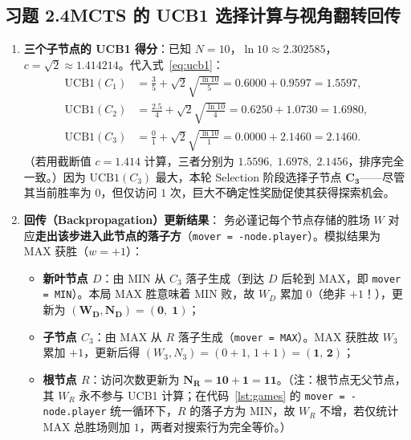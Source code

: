 \subsection*{习题 2.4\quad MCTS 的 UCB1 选择计算与视角翻转回传}
\begin{enumerate}[label=(\arabic*), leftmargin=1.8em]
  \item \textbf{三个子节点的 UCB1 得分}：已知 $N = 10$，$\ln 10 \approx 2.302585$，$c = \sqrt{2} \approx 1.414214$。代入式~\eqref{eq:ucb1}：
  \begin{align*}
    \mathrm{UCB1}(C_1) &= \frac{3}{5} + \sqrt{2}\sqrt{\frac{\ln 10}{5}} = 0.6000 + 0.9597 = \mathbf{1.5597}, \\
    \mathrm{UCB1}(C_2) &= \frac{2.5}{4} + \sqrt{2}\sqrt{\frac{\ln 10}{4}} = 0.6250 + 1.0730 = \mathbf{1.6980}, \\
    \mathrm{UCB1}(C_3) &= \frac{0}{1} + \sqrt{2}\sqrt{\frac{\ln 10}{1}} = 0.0000 + 2.1460 = \mathbf{2.1460}.
  \end{align*}
  （若用截断值 $c=1.414$ 计算，三者分别为 $1.5596,\; 1.6978,\; 2.1456$，排序完全一致。）因为 $\mathrm{UCB1}(C_3)$ 最大，本轮 Selection 阶段选择子节点 $\mathbf{C_3}$——尽管其当前胜率为 $0$，但仅访问 $1$ 次，巨大不确定性奖励促使其获得探索机会。
  \item \textbf{回传（Backpropagation）更新结果}：
  务必谨记每个节点存储的胜场 $W$ 对应\textbf{走出该步进入此节点的落子方}（\texttt{mover = -node.player}）。模拟结果为 \textsf{MAX} 获胜（$w = +1$）：
  \begin{itemize}
    \item \textbf{新叶节点 $D$}：由 \textsf{MIN} 从 $C_3$ 落子生成（到达 $D$ 后轮到 \textsf{MAX}，即 \texttt{mover = MIN}）。本局 \textsf{MAX} 胜意味着 \textsf{MIN} 败，故 $W_D$ 累加 $0$（绝非 $+1$！），更新为 $\mathbf{(W_D, N_D) = (0,\; 1)}$；
    \item \textbf{子节点 $C_3$}：由 \textsf{MAX} 从 $R$ 落子生成（\texttt{mover = MAX}）。\textsf{MAX} 获胜故 $W_3$ 累加 $+1$，更新后得 $(W_3, N_3) = (0+1,\, 1+1) = \mathbf{(1,\, 2)}$；
    \item \textbf{根节点 $R$}：访问次数更新为 $\mathbf{N_R = 10 + 1 = 11}$。（注：根节点无父节点，其 $W_R$ 永不参与 UCB1 计算；在代码~\ref{lst:games} 的 \texttt{mover = -node.player} 统一循环下，$R$ 的落子方为 \textsf{MIN}，故 $W_R$ 不增，若仅统计 \textsf{MAX} 总胜场则加 $1$，两者对搜索行为完全等价。）
  \end{itemize}
\end{enumerate}

